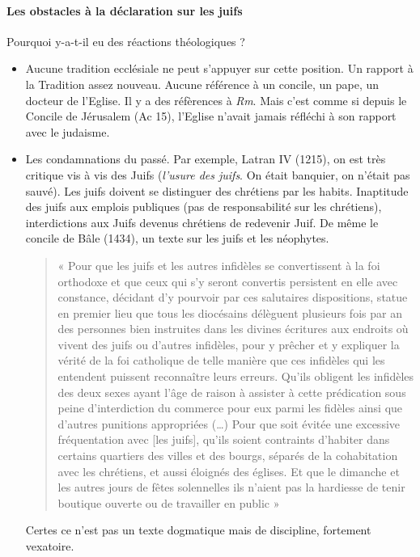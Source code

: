     \paragraph{Les obstacles à la déclaration sur les juifs} Pourquoi y-a-t-il eu des réactions théologiques ?
    \begin{itemize}
        \item Aucune tradition ecclésiale ne peut s'appuyer sur cette position. Un rapport à la Tradition assez nouveau. Aucune référence à un concile, un pape, un docteur de l'Eglise. Il y a des réfèrences à \emph{Rm}. Mais c'est comme si depuis le Concile de Jérusalem (Ac 15), l'Eglise n'avait jamais réfléchi à son rapport avec le judaisme.
        
        \item Les condamnations du passé. Par exemple, Latran IV (1215), on est très critique vis à vis des Juifs (\textit{l'usure des juifs}. On était banquier, on n'était pas sauvé). Les juifs doivent se distinguer des chrétiens par les habits. Inaptitude des juifs aux emplois publiques (pas de responsabilité sur les chrétiens), interdictions aux Juifs devenus chrétiens de redevenir Juif.
        De même le concile de Bâle (1434), un texte sur les juifs et les néophytes.
  \begin{quote}
    «  Pour  que  les  juifs  et  les  autres  infidèles   se  convertissent  à  la  foi  orthodoxe  et  que  ceux  qui s’y  seront  convertis  persistent  en  elle  avec  constance,  décidant  d’y  pourvoir  par  ces  salutaires dispositions,  statue  en  premier  lieu  que  tous  les  diocésains  délèguent  plusieurs  fois  par  an  des personnes  bien  instruites  dans  les  divines  écritures  aux  endroits  où  vivent  des  juifs  ou  d’autres infidèles,  pour  y  prêcher  et  y  expliquer  la  vérité  de  la  foi  catholique  de  telle  manière  que  ces infidèles  qui  les  entendent  puissent  reconnaître  leurs  erreurs.  Qu’ils  obligent  les  infidèles  des deux  sexes  ayant  l’âge  de  raison  à  assister  à  cette  prédication  sous  peine  d’interdiction  du commerce  pour  eux  parmi  les  fidèles  ainsi  que  d’autres  punitions  appropriées  (…)  Pour  que soit  évitée  une  excessive  fréquentation  avec  [les  juifs],  qu’ils  soient  contraints  d’habiter  dans certains  quartiers  des  villes  et  des  bourgs,  séparés  de  la  cohabitation  avec  les  chrétiens,  et aussi  éloignés  des  églises.  Et  que  le  dimanche  et  les  autres  jours  de  fêtes  solennelles  ils n’aient  pas  la  hardiesse  de  tenir  boutique  ouverte  ou  de  travailler  en  public  »  
\end{quote}
    Certes ce n'est pas un texte dogmatique mais de discipline, fortement vexatoire.
        

\end{itemize}
